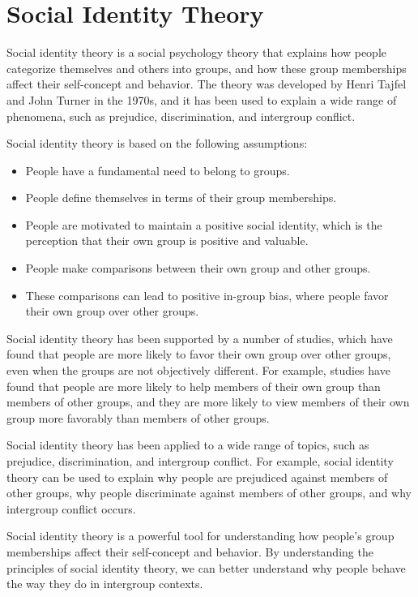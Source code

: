 \documentclass[
]{book}
\begin{document}
\section{Social Identity Theory}\label{social-identity-theory}

Social identity theory is a social psychology theory that explains how people categorize themselves and others into groups, and how these group memberships affect their self-concept and behavior. The theory was developed by Henri Tajfel and John Turner in the 1970s, and it has been used to explain a wide range of phenomena, such as prejudice, discrimination, and intergroup conflict.

Social identity theory is based on the following assumptions:

\begin{itemize}
\item
  People have a fundamental need to belong to groups.
\item
  People define themselves in terms of their group memberships.
\item
  People are motivated to maintain a positive social identity, which is the perception that their own group is positive and valuable.
\item
  People make comparisons between their own group and other groups.
\item
  These comparisons can lead to positive in-group bias, where people favor their own group over other groups.
\end{itemize}

Social identity theory has been supported by a number of studies, which have found that people are more likely to favor their own group over other groups, even when the groups are not objectively different. For example, studies have found that people are more likely to help members of their own group than members of other groups, and they are more likely to view members of their own group more favorably than members of other groups.

Social identity theory has been applied to a wide range of topics, such as prejudice, discrimination, and intergroup conflict. For example, social identity theory can be used to explain why people are prejudiced against members of other groups, why people discriminate against members of other groups, and why intergroup conflict occurs.

Social identity theory is a powerful tool for understanding how people's group memberships affect their self-concept and behavior. By understanding the principles of social identity theory, we can better understand why people behave the way they do in intergroup contexts.
\end{document}
